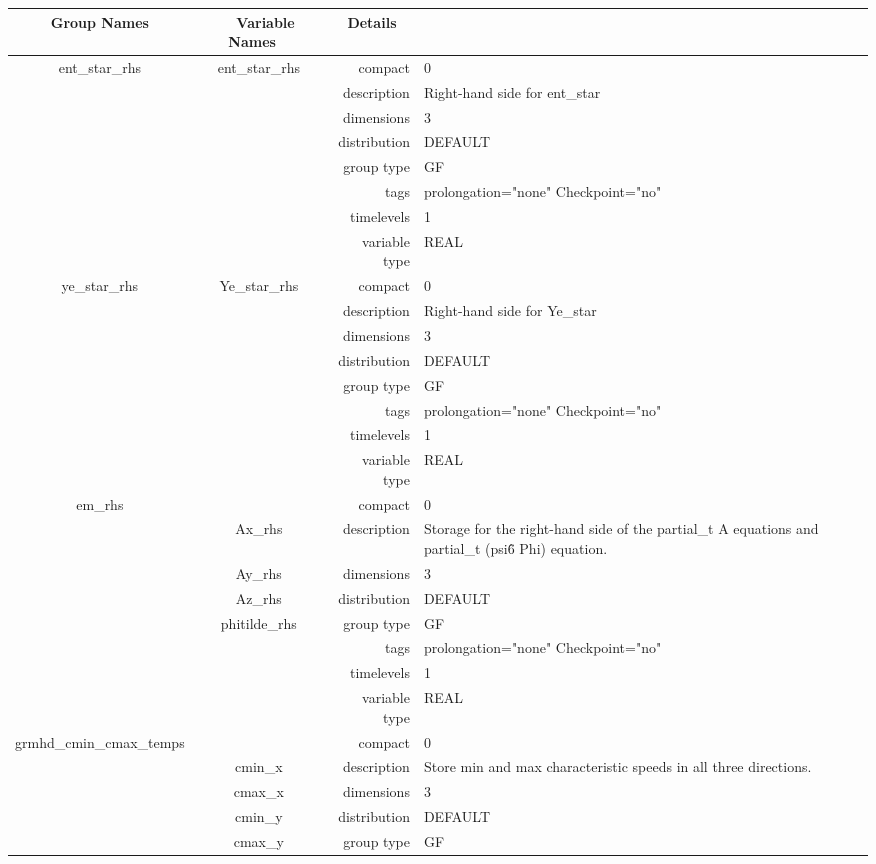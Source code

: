 \begin{tabular*}{150mm}{|c|c@{\extracolsep{\fill}}|rl|} \hline 
~ {\bf Group Names} ~ & ~ {\bf Variable Names} ~  &{\bf Details} ~ & ~ \\ 
\hline 
ent\_star\_rhs & ent\_star\_rhs & compact & 0 \\ 
 &  & description & Right-hand side for ent\_star \\ 
 &  & dimensions & 3 \\ 
 &  & distribution & DEFAULT \\ 
 &  & group type & GF \\ 
 &  & tags & prolongation="none" Checkpoint="no" \\ 
 &  & timelevels & 1 \\ 
 &  & variable type & REAL \\ 
\hline 
ye\_star\_rhs & Ye\_star\_rhs & compact & 0 \\ 
 &  & description & Right-hand side for Ye\_star \\ 
 &  & dimensions & 3 \\ 
 &  & distribution & DEFAULT \\ 
 &  & group type & GF \\ 
 &  & tags & prolongation="none" Checkpoint="no" \\ 
 &  & timelevels & 1 \\ 
 &  & variable type & REAL \\ 
\hline 
em\_rhs &  & compact & 0 \\ 
 & Ax\_rhs & description & Storage for the right-hand side of the partial\_t A equations and partial\_t (psi\^6 Phi) equation. \\ 
 & Ay\_rhs & dimensions & 3 \\ 
 & Az\_rhs & distribution & DEFAULT \\ 
 & phitilde\_rhs & group type & GF \\ 
 &  & tags & prolongation="none" Checkpoint="no" \\ 
 &  & timelevels & 1 \\ 
 &  & variable type & REAL \\ 
\hline 
grmhd\_cmin\_cmax\_temps &  & compact & 0 \\ 
 & cmin\_x & description & Store min and max characteristic speeds in all three directions. \\ 
 & cmax\_x & dimensions & 3 \\ 
 & cmin\_y & distribution & DEFAULT \\ 
 & cmax\_y & group type & GF \\ 

\end{tabular*}
